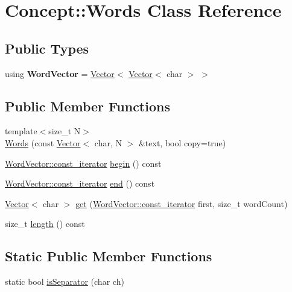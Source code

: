 \hypertarget{class_concept_1_1_words}{}\section{Concept\+::Words Class Reference}
\label{class_concept_1_1_words}
\subsection*{Public Types}
\begin{DoxyCompactItemize}
\item 
\mbox{\label{class_concept_1_1_words_abfeda0970f6853700b350dc1e26c5723}} 
using {\bfseries Word\+Vector} = \mbox{\hyperlink{class_concept_1_1_vector}{Vector}}$<$ \mbox{\hyperlink{class_concept_1_1_vector}{Vector}}$<$ char $>$ $>$
\end{DoxyCompactItemize}
\subsection*{Public Member Functions}
\begin{DoxyCompactItemize}
\item 
{\footnotesize template$<$size\+\_\+t N$>$ }\\\mbox{\hyperlink{class_concept_1_1_words_a8a8447c2038540ffcdf0052e0edec2c4}{Words}} (const \mbox{\hyperlink{class_concept_1_1_vector}{Vector}}$<$ char, N $>$ \&text, bool copy=true)
\item 
\mbox{\hyperlink{class_concept_1_1_vector}{Word\+Vector\+::const\+\_\+iterator}} \mbox{\hyperlink{class_concept_1_1_words_a90f042f181232ee4ca33668e1c7d82c9}{begin}} () const
\item 
\mbox{\hyperlink{class_concept_1_1_vector}{Word\+Vector\+::const\+\_\+iterator}} \mbox{\hyperlink{class_concept_1_1_words_a9d52168c7d5655db4aaf8959c011f549}{end}} () const
\item 
\mbox{\hyperlink{class_concept_1_1_vector}{Vector}}$<$ char $>$ \mbox{\hyperlink{class_concept_1_1_words_a96f098f0ad1a12e098ad515bf1e38fd1}{get}} (\mbox{\hyperlink{class_concept_1_1_vector}{Word\+Vector\+::const\+\_\+iterator}} first, size\+\_\+t word\+Count)
\item 
size\+\_\+t \mbox{\hyperlink{class_concept_1_1_words_aecd76499829e2452564918a777ca8016}{length}} () const
\end{DoxyCompactItemize}
\subsection*{Static Public Member Functions}
\begin{DoxyCompactItemize}
\item 
static bool \mbox{\hyperlink{class_concept_1_1_words_a82004181ac36a8e592e3ddba2f314840}{is\+Separator}} (char ch)
\end{DoxyCompactItemize}


